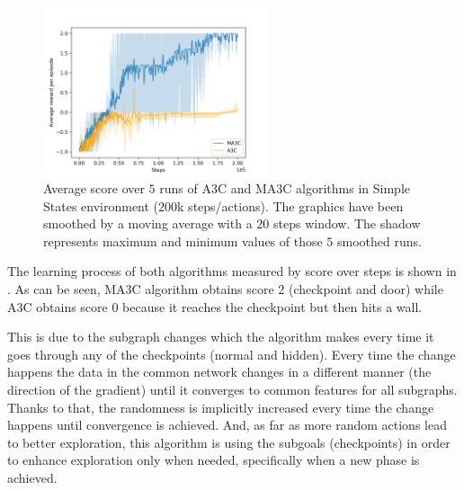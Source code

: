 \begin{figure}[hbtp]
\begin{center}
\includegraphics[width=250]{img/SimpleStates_performance.png}
\end{center}
\caption[Simple States performance]
{Average score over $5$ runs of \ac{A3C} and \ac{MA3C} algorithms in Simple States environment (200k steps/actions).
The graphics have been smoothed by a moving average with a $20$ steps window.
The shadow represents maximum and minimum values of those $5$ smoothed runs.}
\label{fig:SimpleStates_performance}
\end{figure}

The learning process of both algorithms measured by score over steps is shown in .
As can be seen, \ac{MA3C} algorithm obtains score $2$ (checkpoint and door) while \ac{A3C} obtains score $0$ because it
reaches the checkpoint but then hits a wall.

This is due to the subgraph changes which the algorithm makes every time it goes through any of the checkpoints (normal
and hidden).
Every time the change happens the data in the common network changes in a different manner (the direction of the gradient) %
until it converges to common features for all subgraphs.
Thanks to that, the randomness is implicitly increased every time the change happens until convergence is achieved.
And, as far as more random actions lead to better exploration, this algorithm is using the subgoals (checkpoints) in
order to enhance exploration only when needed, specifically when a new phase is achieved.

